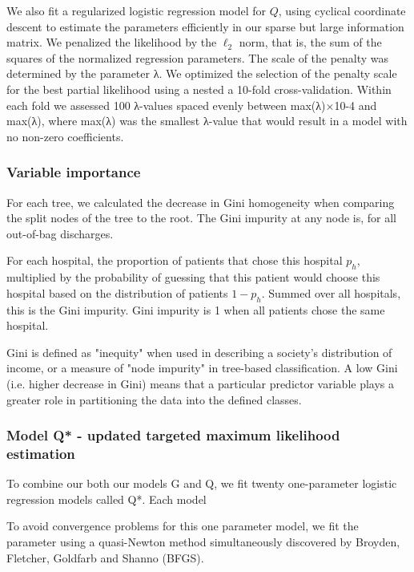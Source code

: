 \documentclass[]{article}\usepackage[]{graphicx}\usepackage[]{color}
\begin{document}
We also fit a regularized logistic regression model for \(Q\), using cyclical coordinate descent to estimate the parameters efficiently in our sparse but large information matrix. We penalized the likelihood by the \(\ell_2\) norm, that is, the sum of the squares of the normalized regression parameters. The scale of the penalty was determined by the parameter λ. We optimized the selection of the penalty scale for the best partial likelihood using a nested a 10-fold cross-validation. Within each fold we assessed 100 λ-values spaced evenly between max(λ)×10-4 and max(λ), where max(λ) was the smallest λ-value that would result in a model with no non-zero coefficients.

\subsubsection{Variable importance}
For each tree, we calculated the decrease in Gini homogeneity when comparing the split nodes of the tree to the root. 
The Gini impurity at any node is, for all out-of-bag discharges.

For each hospital, the proportion of patients that chose this hospital $p_h$, multiplied by the probability of guessing that this patient would choose this hospital based on the distribution of patients $1-p_h$. Summed over all hospitals, this is the Gini impurity. Gini impurity is 1 when all patients chose the same hospital.

Gini is defined as "inequity" when used in describing a society's distribution of income, or a measure of "node impurity" in tree-based classification. A low Gini (i.e. higher decrease in Gini) means that a particular predictor variable plays a greater role in partitioning the data into the defined classes. 


\subsubsection{Model Q* - updated targeted maximum likelihood estimation}
To combine our both our models G and Q, we fit twenty one-parameter logistic regression models called Q*. Each model 

To avoid convergence problems for this one parameter model, we fit the parameter using a quasi-Newton method simultaneously discovered by Broyden\supercite{broyden_convergence_1970}, Fletcher\supercite{fletcher_new_1970}, Goldfarb\supercite{goldfarb_family_1970} and Shanno\supercite{shanno_conditioning_1970} (BFGS).
\end{document}

